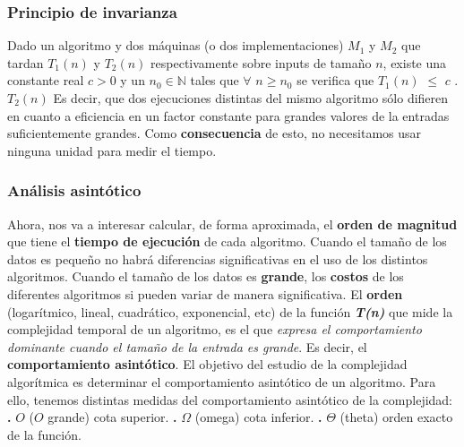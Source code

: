 \documentclass[10pt,a4paper]{article}
\begin{document}
\subsubsection{Principio de invarianza}

Dado un algoritmo y dos máquinas (o dos implementaciones) $M_{1}$ y $M_{2}$ que tardan $T_{1}(n)$ y $T_{2}(n)$ respectivamente sobre inputs de tamaño $n$, existe una constante real $c > 0$ y un $n_{0} \in \mathbb{N}$ tales que $\forall$ $n \geq n_{0}$ se verifica que $T_{1}(n)$ $\leq$ $c$ . $T_{2}(n)$  
\newline
\newline
Es decir, que dos ejecuciones distintas del mismo algoritmo sólo difieren en cuanto a eficiencia en un factor constante para grandes valores de la entradas suficientemente grandes.
\newline
\newline
Como \textbf{consecuencia} de esto, no necesitamos usar ninguna unidad para medir el tiempo.

\subsubsection{Análisis asintótico}

Ahora, nos va a interesar calcular, de forma aproximada, el \textbf{orden de magnitud} que tiene el \textbf{tiempo de ejecución} de cada algoritmo.
\newline
\newline
Cuando el tamaño de los datos es pequeño no habrá diferencias significativas en el uso de los distintos algoritmos. 
\newline
\newline
Cuando el tamaño de los datos es \textbf{grande}, los \textbf{costos} de los diferentes algoritmos si pueden variar de manera significativa. 
\newline
\newline
El \textbf{orden} (logarítmico, lineal, cuadrático, exponencial, etc) de la función \textbf{\textit{T(n)}} que mide la complejidad temporal de un algoritmo, es el que \textit{expresa el comportamiento dominante cuando el tamaño de la entrada es grande}. 
\newline
\newline
Es decir, el \textbf{comportamiento asintótico}.
\newline
\newline
El objetivo del estudio de la complejidad algorítmica es determinar el comportamiento asintótico de un algoritmo.
\newline
\newline
Para ello, tenemos distintas medidas del comportamiento asintótico de la complejidad:
\newline
\newline
\textbf{.} $O$ ($O$ grande) cota superior. 
\newline
\newline
\textbf{.} $\Omega$ (omega) cota inferior. 
\newline
\newline
\textbf{.} $\Theta$ (theta) orden exacto de la función. 
\newpage
\end{document}
